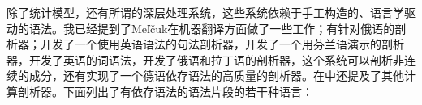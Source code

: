 除了统计模型，还有所谓的深层处理系统，这些系统依赖于手工构造的、语言学驱动的语法。我已经提到了Meľčuk在机器翻译方面做了一些工作；\citet{HZ60a-u}有针对俄语的剖析器；\citet{SN86a}开发了一个使用英语语法的句法剖析器，\citet*{JLV86a-u}开发了一个用芬兰语演示的剖析器，\citet{Hellwig86a-u,Hellwig2003a,Hellwig2006a}开发了英语的词语法，\citet{Covington90a}开发了俄语和拉丁语的剖析器，这个系统可以剖析非连续的成分，还有\citet{Menzel98a-u}实现了一个德语依存语法的高质量的剖析器。在中还提及了其他计算剖析器。下面列出了有依存语法的语法片段的若干种语言：

